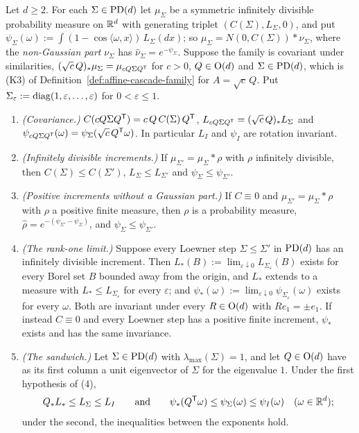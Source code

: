 \begin{proposition}\label{prop:similarity-general-sandwich}
Let $d \ge 2$. For each $\Sigma \in \mathrm{PD}(d)$ let $\mu_\Sigma$ be a symmetric infinitely divisible
probability measure on $\mathbb{R}^d$ with generating triplet $(C(\Sigma), L_\Sigma, 0)$, and put
$\psi_\Sigma(\omega) := \int(1 - \cos\langle\omega,x\rangle)\,L_\Sigma(dx)$; so
$\mu_\Sigma = N(0,C(\Sigma)) * \nu_\Sigma$, where the \emph{non-Gaussian part} $\nu_\Sigma$ has
$\widehat\nu_\Sigma = e^{-\psi_\Sigma}$. Suppose the family is covariant under similarities,
$(\sqrt c\,Q)_*\mu_\Sigma = \mu_{cQ\Sigma Q^{\mathsf{T}}}$ for $c > 0$, $Q \in \mathrm{O}(d)$ and
$\Sigma \in \mathrm{PD}(d)$, which is (K3) of Definition~\ref{def:affine-cascade-family} for $A = \sqrt c\,Q$. Put
$\Sigma_\varepsilon := \operatorname{diag}(1,\varepsilon,\dots,\varepsilon)$ for $0 < \varepsilon \le 1$.
\begin{enumerate}
\item \emph{(Covariance.)} $C(cQ\Sigma Q^{\mathsf{T}}) = c\,Q\,C(\Sigma)\,Q^{\mathsf{T}}$,
$L_{cQ\Sigma Q^{\mathsf{T}}} = (\sqrt c\,Q)_*L_\Sigma$ and
$\psi_{cQ\Sigma Q^{\mathsf{T}}}(\omega) = \psi_\Sigma(\sqrt c\,Q^{\mathsf{T}}\omega)$. In particular $L_I$ and
$\psi_I$ are rotation invariant.
\item \emph{(Infinitely divisible increments.)} If $\mu_{\Sigma'} = \mu_\Sigma * \rho$ with $\rho$
infinitely divisible, then $C(\Sigma) \le C(\Sigma')$, $L_\Sigma \le L_{\Sigma'}$ and
$\psi_\Sigma \le \psi_{\Sigma'}$.
\item \emph{(Positive increments without a Gaussian part.)} If $C \equiv 0$ and
$\mu_{\Sigma'} = \mu_\Sigma * \rho$ with $\rho$ a positive finite measure, then $\rho$ is a
probability measure, $\widehat\rho = e^{-(\psi_{\Sigma'} - \psi_\Sigma)}$, and
$\psi_\Sigma \le \psi_{\Sigma'}$.
\item \emph{(The rank-one limit.)} Suppose every Loewner step $\Sigma \le \Sigma'$ in $\mathrm{PD}(d)$ has an
infinitely divisible increment. Then $L_*(B) := \lim_{\varepsilon\downarrow0}L_{\Sigma_\varepsilon}(B)$
exists for every Borel set $B$ bounded away from the origin, and $L_*$ extends to a \Levy{} measure
with $L_* \le L_{\Sigma_\varepsilon}$ for every $\varepsilon$; and
$\psi_*(\omega) := \lim_{\varepsilon\downarrow0}\psi_{\Sigma_\varepsilon}(\omega)$ exists for every
$\omega$. Both are invariant under every $R \in \mathrm{O}(d)$ with $Re_1 = \pm e_1$. If instead
$C \equiv 0$ and every Loewner step has a positive finite increment, $\psi_*$ exists and has the same
invariance.
\item \emph{(The sandwich.)} Let $\Sigma \in \mathrm{PD}(d)$ with $\lambda_{\max}(\Sigma) = 1$, and let
$Q \in \mathrm{O}(d)$ have as its first column a unit eigenvector of $\Sigma$ for the eigenvalue $1$. Under
the first hypothesis of (4),
\[
  Q_*L_* \le L_\Sigma \le L_I
  \qquad\text{and}\qquad
  \psi_*(Q^{\mathsf{T}}\omega) \le \psi_\Sigma(\omega) \le \psi_I(\omega) \quad (\omega \in \mathbb{R}^d) ;
\]
under the second, the inequalities between the exponents hold.
\end{enumerate}
\end{proposition}

